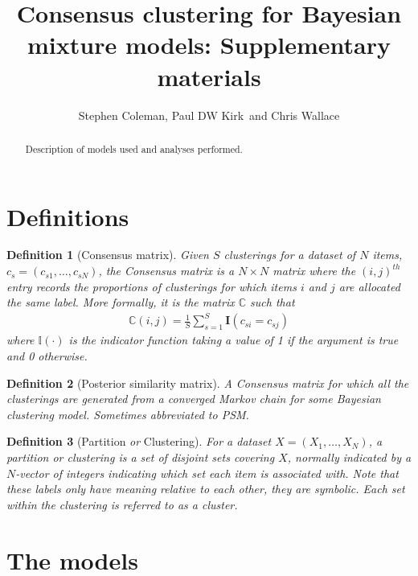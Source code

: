 \documentclass[]{article}
\title{Consensus clustering for Bayesian mixture models: Supplementary materials}
\author{Stephen Coleman, Paul DW Kirk\, and Chris Wallace}
\newtheorem{definition}{Definition}
\begin{document}
\maketitle

\begin{abstract}
Description of models used and analyses performed.
\end{abstract}


\section{Definitions}
\begin{definition}[Consensus matrix]
	Given $S$ clusterings for a dataset of $N$ items, $c_s=(c_{s1}, \ldots, c_{sN})$, the \emph{Consensus matrix} is a $N \times N$ matrix where the $(i, j )^{th}$ entry records the proportions of clusterings for which items $i$ and $j$ are allocated the same label. More formally, it is the matrix $\mathbb{C}$ such that
	\begin{align}
		\mathbb{C}(i, j) = \frac{1}{S} \sum_{s=1}^S \mathbf{I}(c_{si} = c_{sj})
	\end{align}
	where $\mathbb{I}(\cdot)$ is the indicator function taking a value of 1 if the argument is true and 0 otherwise.
\end{definition}

\begin{definition}[Posterior similarity matrix]
	A \emph{Consensus matrix} for which all the clusterings are generated from a converged Markov chain for some Bayesian clustering model. Sometimes abbreviated to \emph{PSM}.
\end{definition}

\begin{definition}[Partition \emph{or} Clustering]
	For a dataset $X=(X_1, \ldots, X_N)$, a \emph{partition} or \emph{clustering} is a set of disjoint sets covering $X$, normally indicated by a $N$-vector of integers indicating which set each item is associated with. Note that these labels only have meaning relative to each other, they are symbolic. Each set within the clustering is referred to as a \emph{cluster}.
\end{definition}

\section{The models} \label{sec:models}
\end{document}
